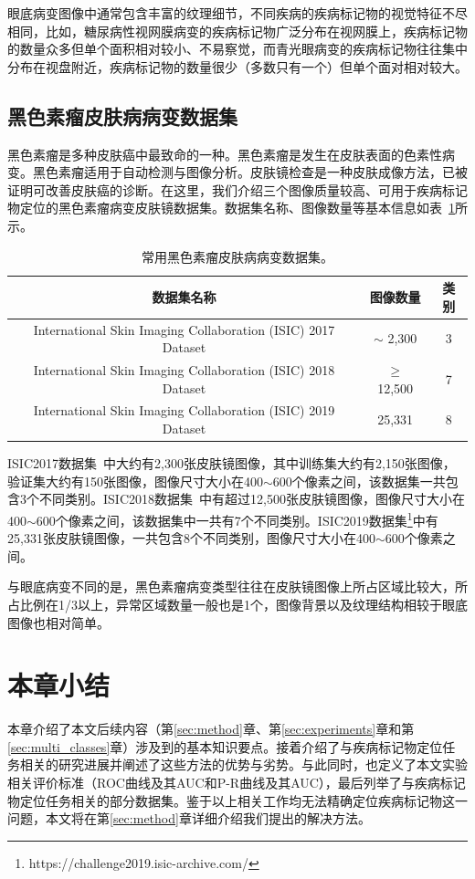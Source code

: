 眼底病变图像中通常包含丰富的纹理细节，不同疾病的疾病标记物的视觉特征不尽相同，比如，糖尿病性视网膜病变的疾病标记物广泛分布在视网膜上，疾病标记物的数量众多但单个面积相对较小、不易察觉，而青光眼病变的疾病标记物往往集中分布在视盘附近，疾病标记物的数量很少（多数只有一个）但单个面对相对较大。

\subsection{黑色素瘤皮肤病病变数据集}\label{subsec:original_dermatoscope_ds_intro}
黑色素瘤是多种皮肤癌中最致命的一种。黑色素瘤是发生在皮肤表面的色素性病变。黑色素瘤适用于自动检测与图像分析。皮肤镜检查是一种皮肤成像方法，已被证明可改善皮肤癌的诊断。在这里，我们介绍三个图像质量较高、可用于疾病标记物定位的黑色素瘤病变皮肤镜数据集。数据集名称、图像数量等基本信息如表~\ref{tab:skin_datasets_info}所示。

\begin{table}[h]
	\centering
	\caption[常用黑色素瘤皮肤病病变数据集]{常用黑色素瘤皮肤病病变数据集。}
	\label{tab:skin_datasets_info}
	\begin{tabular}{c|c|c}
		\toprule[2pt]
		数据集名称 & 图像数量 & 类别 \\
		\midrule[2pt]
		International Skin Imaging Collaboration (ISIC) 2017 Dataset &  $\sim$ 2,300 & 3  \\ \hline
		International Skin Imaging Collaboration (ISIC) 2018 Dataset & $\geq$ 12,500 & 7  \\ \hline
		International Skin Imaging Collaboration (ISIC) 2019 Dataset& 25,331 & 8    \\ 
		\bottomrule[2pt]
	\end{tabular}
\end{table}

ISIC2017数据集~\cite{codella2018skin}中大约有2,300张皮肤镜图像，其中训练集大约有2,150张图像，验证集大约有150张图像，图像尺寸大小在400$\sim $600个像素之间，该数据集一共包含3个不同类别。ISIC2018数据集~\cite{codella2019skin, tschandl2018ham10000}中有超过12,500张皮肤镜图像，图像尺寸大小在400$\sim $600个像素之间，该数据集中一共有7个不同类别。ISIC2019数据集\footnote{https://challenge2019.isic-archive.com/}中有25,331张皮肤镜图像，一共包含8个不同类别，图像尺寸大小在400$\sim $600个像素之间。

与眼底病变不同的是，黑色素瘤病变类型往往在皮肤镜图像上所占区域比较大，所占比例在1/3以上，异常区域数量一般也是1个，图像背景以及纹理结构相较于眼底图像也相对简单。
\section{本章小结}
本章介绍了本文后续内容（第\ref{sec:method}章、第\ref{sec:experiments}章和第\ref{sec:multi_classes}章）涉及到的基本知识要点。接着介绍了与疾病标记物定位任务相关的研究进展并阐述了这些方法的优势与劣势。与此同时，也定义了本文实验相关评价标准（ROC曲线及其AUC和P-R曲线及其AUC），最后列举了与疾病标记物定位任务相关的部分数据集。鉴于以上相关工作均无法精确定位疾病标记物这一问题，本文将在第\ref{sec:method}章详细介绍我们提出的解决方法。